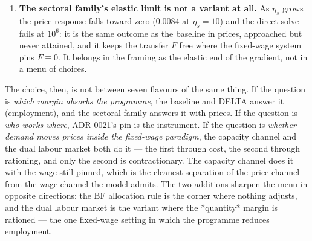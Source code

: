 \documentclass[11pt]{article}
\begin{document}
\begin{enumerate}
      raises everyone's costs, so the programme's employment gain must come from
      outside the pressured chain and can be more than offset. Two further
      readings. First, the constrained sectors sit at about half of their
      capacity ceiling ($y^{max}_i = A_i \alpha_i^{1/(\epsilon-1)}\bar{L}_i$,
      finite because labour and intermediates are complements at
      $\epsilon = 0.5$; the baseline sits at the factor share $\alpha_i$ of it),
      so the constraint bites through the substitution margin rather than at a
      hard ceiling. Second, the comparison with the price-based rigidity is
      instructive: the sectoral family's rigid-programme variant reads
      $-0.34\%$ employment and $-2.69\%$ consumption at F2, i.e. \emph{milder}
      on employment than the quantity-constrained dual ($-0.88\%$), because a
      vertical supply curve still lets the wage --- and through it the price ---
      absorb, whereas a quantity constraint forces the cost up. The two
      rigidities are therefore not interchangeable: one prices the bottleneck,
      the other rations it.
\item \textbf{The sectoral family's elastic limit is not a variant at all.} As
      $\eta_s$ grows the price response falls toward zero ($0.0084$ at
      $\eta_s = 10$) and the direct solve fails at $10^6$: it is the same
      outcome as the baseline in prices, approached but never attained, and it
      keeps the transfer $F$ free where the fixed-wage system pins $F \equiv 0$.
      It belongs in the framing as the elastic end of the gradient, not in a
      menu of choices.
\end{enumerate}

The choice, then, is not between seven flavours of the same thing. If the
question is \emph{which margin absorbs the programme}, the baseline and DELTA
answer it (employment), and the sectoral family answers it with prices. If the
question is \emph{who works where}, ADR-0021's pin is the instrument. If the
question is \emph{whether demand moves prices inside the fixed-wage paradigm},
the capacity channel and the dual labour market both do it --- the first through
cost, the second through rationing, and only the second is contractionary. The
capacity channel does it with the wage still pinned, which is the cleanest
separation of the price channel from the wage channel the model admits. The two additions sharpen the menu in opposite directions: the BF
allocation rule is the corner where nothing adjusts, and the dual labour market
is the variant where the *quantity* margin is rationed --- the one fixed-wage
setting in which the programme reduces employment.
\end{document}
